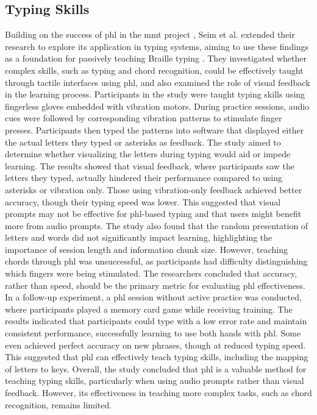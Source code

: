 \subsection{Typing Skills}
Building on the success of \gls{phl} in the \gls{mmt} project \cite{Markow2010, Kohlsdorf2010, Huang2010}, Seim et al. extended their research to explore its application in typing systems, aiming to use these findings as a foundation for passively teaching Braille typing \cite{Seim2014}. They investigated whether complex skills, such as typing and chord recognition, could be effectively taught through tactile interfaces using \gls{phl}, and also examined the role of visual feedback in the learning process.
Participants in the study were taught typing skills using fingerless gloves embedded with vibration motors. During practice sessions, audio cues were followed by corresponding vibration patterns to stimulate finger presses. Participants then typed the patterns into software that displayed either the actual letters they typed or asterisks as feedback. The study aimed to determine whether visualizing the letters during typing would aid or impede learning.
The results showed that visual feedback, where participants saw the letters they typed, actually hindered their performance compared to using asterisks or vibration only. Those using vibration-only feedback achieved better accuracy, though their typing speed was lower. This suggested that visual prompts may not be effective for \gls{phl}-based typing and that users might benefit more from audio prompts.
The study also found that the random presentation of letters and words did not significantly impact learning, highlighting the importance of session length and information chunk size. However, teaching chords through \gls{phl} was unsuccessful, as participants had difficulty distinguishing which fingers were being stimulated. The researchers concluded that accuracy, rather than speed, should be the primary metric for evaluating \gls{phl} effectiveness.
In a follow-up experiment, a \gls{phl} session without active practice was conducted, where participants played a memory card game while receiving training. The results indicated that participants could type with a low error rate and maintain consistent performance, successfully learning to use both hands with \gls{phl}. Some even achieved perfect accuracy on new phrases, though at reduced typing speed. This suggested that \gls{phl} can effectively teach typing skills, including the mapping of letters to keys.
Overall, the study concluded that \gls{phl} is a valuable method for teaching typing skills, particularly when using audio prompts rather than visual feedback. However, its effectiveness in teaching more complex tasks, such as chord recognition, remains limited.

